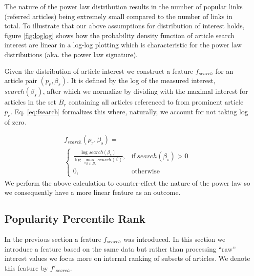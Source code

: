\medskip

The nature of the power law distribution results in the number of popular links (referred articles) being extremely small compared to the number of links in total. To illustrate that our above assumptions for distribution of interest holds, figure \ref{fig:loglog} shows how the probability density function of article search interest are linear in a log-log plotting which is characteristic for the power law distributions (aka. the power law signature).




Given the distribution of article interest we construct a feature $f_{search}$ for an article pair $(p_r, \beta_s)$. It is defined by the log of the measured interest, $search(\beta_s)$, after which we normalize by dividing with the maximal interest for articles in the set $B_r$ containing all articles referenced to from prominent article $p_r$. Eq. \ref{eq:fsearch} formalizes this where, naturally, we account for not taking log of zero.

\begin{multline}
f_{search}(p_r, \beta_s) = \\
\begin{cases}
      \displaystyle \frac{\log search(\beta_s)}{ \log \displaystyle \max_{\forall \beta \in B_r} search(\beta)}, & \text{if}\ search(\beta_s)>0 \\
      0, & \text{otherwise}
    \end{cases}
    \label{eq:fsearch}
\end{multline}
We perform the above calculation to counter-effect the nature of the power law so we consequently have a more linear feature as an outcome.

\subsection{Popularity Percentile Rank}
\label{popularity percentile rank}
In the previous section a feature $f_{search}$ was introduced. In this section we introduce a feature based on the same data but rather than processing ``raw'' interest values we focus more on internal ranking of subsets of articles. We denote this feature by $f'_{search}$.

